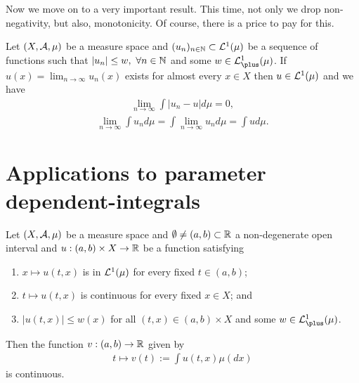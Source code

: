 Now we move on to a very important result. This time, not only we drop non-negativity, but also, monotonicity. Of course, there is a price to pay for this.

\begin{thm}
	\label{thm:lebesgue-dominated-convergence}
	Let $(X, \mathcal{A}, \mu)$ be a measure space and $(u_n)_{n\in\mathbb{N}} \subset \mathcal{L}^1(\mu)$ be a sequence of functions such that $|u_n| \leq w,\ \forall n \in \mathbb{N}$ and some $w \in \calL^1_\plus(\mu)$. If $u(x) = \lim_{n \to \infty} u_n(x)$ exists for almost every $x\in X$ then $u \in \mathcal{L}^1(\mu)$ and we have
	\begin{align}
		\lim_{n \to \infty} \int |u_n - u| d\mu = 0,
	\end{align}
	\begin{align}
		\lim_{n \to \infty} \int u_n d\mu = \int \lim_{n \to \infty} u_n d\mu = \int ud\mu.
	\end{align}
\end{thm}

\section{Applications to parameter dependent-integrals}

\begin{thm}
	\label{thm:continuity-lemma}
	
	Let $(X, \mathcal{A}, \mu)$ be a measure space and $\emptyset \neq (a,b) \subset \mathbb{R}$ a non-degenerate open interval and $u: (a, b) \times X \to \mathbb{R}$ be a function satisfying
	\begin{enumerate}
		\item $x \mapsto u(t, x)$ is in $\mathcal{L}^1(\mu)$ for every fixed $t \in (a, b)$;
		\item $t \mapsto u(t, x)$ is continuous for every fixed $x \in X$; and
		\item $|u(t, x)| \leq w(x)$ for all $(t, x) \in (a, b) \times X$ and some $w \in \calL^1_\plus(\mu)$.
	\end{enumerate}
	Then the function $v: (a, b) \to \mathbb{R}$ given by
	\begin{align}
		t \mapsto v(t) := \int u(t, x) \mu(dx)
	\end{align}
	is continuous.
\end{thm}

